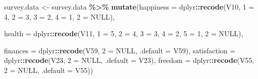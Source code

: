 \documentclass[
]{article}
\newenvironment{Shaded}{\begin{snugshade}}{\end{snugshade}}
\newcommand{\AttributeTok}[1]{\textcolor[rgb]{0.13,0.29,0.53}{#1}}
\newcommand{\ConstantTok}[1]{\textcolor[rgb]{0.56,0.35,0.01}{#1}}
\newcommand{\DecValTok}[1]{\textcolor[rgb]{0.00,0.00,0.81}{#1}}
\newcommand{\FunctionTok}[1]{\textcolor[rgb]{0.13,0.29,0.53}{\textbf{#1}}}
\newcommand{\NormalTok}[1]{#1}
\newcommand{\OtherTok}[1]{\textcolor[rgb]{0.56,0.35,0.01}{#1}}
\newcommand{\SpecialCharTok}[1]{\textcolor[rgb]{0.81,0.36,0.00}{\textbf{#1}}}
\newcommand{\StringTok}[1]{\textcolor[rgb]{0.31,0.60,0.02}{#1}}
\begin{document}
\begin{Shaded}
\begin{Highlighting}[]
\NormalTok{survey.data }\OtherTok{\textless{}{-}}\NormalTok{ survey.data }\SpecialCharTok{\%\textgreater{}\%}
  \FunctionTok{mutate}\NormalTok{(}\AttributeTok{happiness =}\NormalTok{ dplyr}\SpecialCharTok{::}\FunctionTok{recode}\NormalTok{(V10, }
                                   \StringTok{\textquotesingle{}1\textquotesingle{}} \OtherTok{=} \DecValTok{4}\NormalTok{,}
                                   \StringTok{\textquotesingle{}2\textquotesingle{}} \OtherTok{=} \DecValTok{3}\NormalTok{,}
                                   \StringTok{\textquotesingle{}3\textquotesingle{}} \OtherTok{=} \DecValTok{2}\NormalTok{,}
                                   \StringTok{\textquotesingle{}4\textquotesingle{}} \OtherTok{=} \DecValTok{1}\NormalTok{, }
                                   \StringTok{\textquotesingle{}{-}2\textquotesingle{}} \OtherTok{=} \ConstantTok{NULL}\NormalTok{),}
         
         \AttributeTok{health =}\NormalTok{ dplyr}\SpecialCharTok{::}\FunctionTok{recode}\NormalTok{(V11,}
                                \StringTok{\textquotesingle{}1\textquotesingle{}} \OtherTok{=} \DecValTok{5}\NormalTok{, }
                                \StringTok{\textquotesingle{}2\textquotesingle{}} \OtherTok{=} \DecValTok{4}\NormalTok{, }
                                \StringTok{\textquotesingle{}3\textquotesingle{}} \OtherTok{=} \DecValTok{3}\NormalTok{,}
                                \StringTok{\textquotesingle{}4\textquotesingle{}} \OtherTok{=} \DecValTok{2}\NormalTok{,}
                                \StringTok{\textquotesingle{}5\textquotesingle{}} \OtherTok{=} \DecValTok{1}\NormalTok{, }
                                \StringTok{\textquotesingle{}{-}2\textquotesingle{}} \OtherTok{=} \ConstantTok{NULL}\NormalTok{),}
         
         \AttributeTok{finances =}\NormalTok{ dplyr}\SpecialCharTok{::}\FunctionTok{recode}\NormalTok{(V59, }
                                  \StringTok{\textquotesingle{}{-}2\textquotesingle{}} \OtherTok{=} \ConstantTok{NULL}\NormalTok{,}
                                  \AttributeTok{.default =}\NormalTok{ V59),}
         \AttributeTok{satisfaction =}\NormalTok{ dplyr}\SpecialCharTok{::}\FunctionTok{recode}\NormalTok{(V23, }
                                  \StringTok{\textquotesingle{}{-}2\textquotesingle{}} \OtherTok{=} \ConstantTok{NULL}\NormalTok{,}
                                  \AttributeTok{.default =}\NormalTok{ V23),}
         \AttributeTok{freedom =}\NormalTok{ dplyr}\SpecialCharTok{::}\FunctionTok{recode}\NormalTok{(V55, }
                                  \StringTok{\textquotesingle{}{-}2\textquotesingle{}} \OtherTok{=} \ConstantTok{NULL}\NormalTok{,}
                                  \AttributeTok{.default =}\NormalTok{ V55))}
\end{Highlighting}
\end{Shaded}
\end{document}

